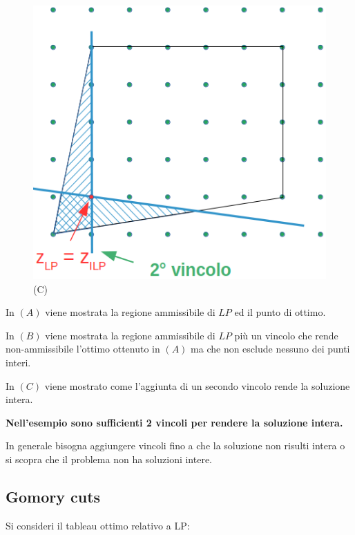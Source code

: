 \begin{figure}[!htb]
	\includegraphics[width=\linewidth]{images/graph11.png}
	(C)
	\label{fig:paniditaglio3}
	\endminipage
\end{figure}

In $(A)$ viene mostrata la regione ammissibile di $LP$ ed il punto di ottimo.

In $(B)$ viene mostrata la regione ammissibile di $LP$ più un vincolo che rende non-ammissibile l'ottimo ottenuto in $(A)$ ma che non esclude nessuno dei punti interi.

In $(C)$ viene mostrato come l'aggiunta di un secondo vincolo rende la soluzione intera.

\textbf{Nell'esempio sono sufficienti 2 vincoli per rendere la soluzione intera.}

In generale bisogna aggiungere vincoli fino a che la soluzione non risulti intera o si scopra che il problema non ha soluzioni intere.

\subsection{Gomory cuts}
Si consideri il tableau ottimo relativo a LP:

